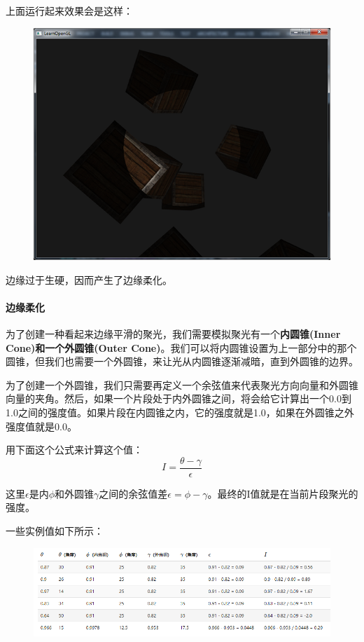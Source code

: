 \documentclass[UTF8,a4paper,12pt]{ctexbook}
\begin{document}
			上面运行起来效果会是这样：
			\begin{figure}[H]
				\centering
				\includegraphics[width=.79\linewidth]{light_casters_spotlight_hard}
			\end{figure}
			
			边缘过于生硬，因而产生了边缘柔化。
			
			\paragraph{边缘柔化}
				为了创建一种看起来边缘平滑的聚光，我们需要模拟聚光有一个\textbf{内圆锥(Inner Cone)和一个外圆锥(Outer Cone)}。我们可以将内圆锥设置为上一部分中的那个圆锥，但我们也需要一个外圆锥，来让光从内圆锥逐渐减暗，直到外圆锥的边界。
				
				为了创建一个外圆锥，我们只需要再定义一个余弦值来代表聚光方向向量和外圆锥向量的夹角。然后，如果一个片段处于内外圆锥之间，将会给它计算出一个0.0到1.0之间的强度值。如果片段在内圆锥之内，它的强度就是1.0，如果在外圆锥之外强度值就是0.0。
				
				用下面这个公式来计算这个值：
				$$ I = \dfrac{\theta - \gamma}{\epsilon}$$
				
				这里$\epsilon$是内$\phi$和外圆锥$\gamma$之间的余弦值差$\epsilon = \phi - \gamma$。最终的I值就是在当前片段聚光的强度。
				
				一些实例值如下所示：
				\begin{figure}[H]
					\centering
					\includegraphics[width=.9\linewidth]{outerCut}
				\end{figure}
				
\end{document}
